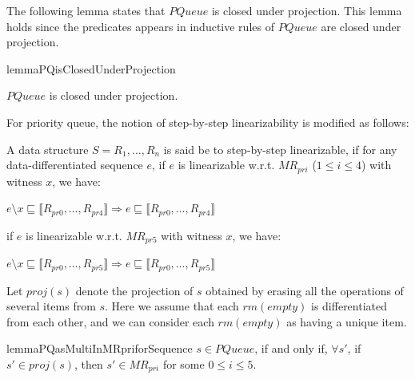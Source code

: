 \documentclass{llncs}
\begin{document}
The following lemma states that $\textit{PQueue}$ is closed under projection. This lemma holds since the predicates appears in inductive rules of $\textit{PQueue}$ are closed under projection.

\begin{restatable}{lemma}{PQisClosedUnderProjection}
\label{lemma:PQ is closed under projection}

$\textit{PQueue}$ is closed under projection.

\end{restatable}




For priority queue, the notion of step-by-step linearizability is modified as follows:

\begin{definition}\label{def:step-by-step linearizability of priority queue}
A data structure $S=R_1, \ldots, R_n$ is said be to step-by-step linearizable, if for any data-differentiated sequence $e$, if $e$ is linearizable w.r.t. $\textit{MR}_{\textit{pri}}$ ($1 \leq i \leq 4$) with witness $x$, we have:

$e \setminus x \sqsubseteq \llbracket R_{\textit{pr0}},\ldots,R_{\textit{pr4}} \rrbracket \Rightarrow e \sqsubseteq \llbracket R_{\textit{pr0}},\ldots,R_{\textit{pr4}} \rrbracket$

\noindent if $e$ is linearizable w.r.t. $\textit{MR}_{\textit{pr5}}$ with witness $x$, we have:

$e \setminus x \sqsubseteq \llbracket R_{\textit{pr0}},\ldots,R_{\textit{pr5}} \rrbracket \Rightarrow e \sqsubseteq \llbracket R_{\textit{pr0}},\ldots,R_{\textit{pr5}} \rrbracket$
\end{definition}

Let $\textit{proj}(s)$ denote the projection of $s$ obtained by erasing all the operations of several items from $s$. Here we assume that each $\textit{rm}(\textit{empty})$ is differentiated from each other, and we can consider each $\textit{rm}(\textit{empty})$ as having a unique item.

\begin{restatable}{lemma}{PQasMultiInMRpriforSequence}
\label{lemma:PQ as multi in MRpri for sequence}
$s \in \textit{PQueue}$, if and only if, $\forall s'$, if $s' \in \textit{proj}(s)$, then $s' \in \textit{MR}_{\textit{pri}}$ for some $0 \leq i \leq 5$.
\end{restatable}
\end{document}
